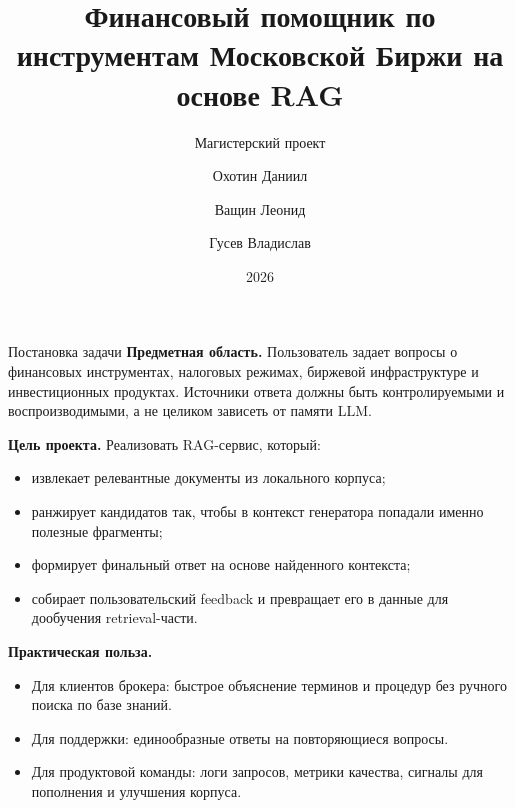 \documentclass[aspectratio=169,11pt]{beamer}
\title{Финансовый помощник по инструментам Московской Биржи на основе RAG}
\subtitle{Магистерский проект}
\author{Охотин Даниил \and Ващин Леонид \and Гусев Владислав}
\institute{НИУ ВШЭ}
\date{2026}
\begin{document}
\begin{frame}
  \titlepage
\end{frame}

\begin{frame}{Постановка задачи}
  \small
  \textbf{Предметная область.} Пользователь задает вопросы о финансовых инструментах, налоговых режимах, биржевой инфраструктуре и инвестиционных продуктах. Источники ответа должны быть контролируемыми и воспроизводимыми, а не целиком зависеть от памяти LLM.

  \vspace{0.4em}
  \textbf{Цель проекта.} Реализовать RAG-сервис, который:
  \begin{itemize}
    \item извлекает релевантные документы из локального корпуса;
    \item ранжирует кандидатов так, чтобы в контекст генератора попадали именно полезные фрагменты;
    \item формирует финальный ответ на основе найденного контекста;
    \item собирает пользовательский feedback и превращает его в данные для дообучения retrieval-части.
  \end{itemize}

  \vspace{0.4em}
  \textbf{Практическая польза.}
  \begin{itemize}
    \item Для клиентов брокера: быстрое объяснение терминов и процедур без ручного поиска по базе знаний.
    \item Для поддержки: единообразные ответы на повторяющиеся вопросы.
    \item Для продуктовой команды: логи запросов, метрики качества, сигналы для пополнения и улучшения корпуса.
  \end{itemize}
\end{frame}
\end{document}
